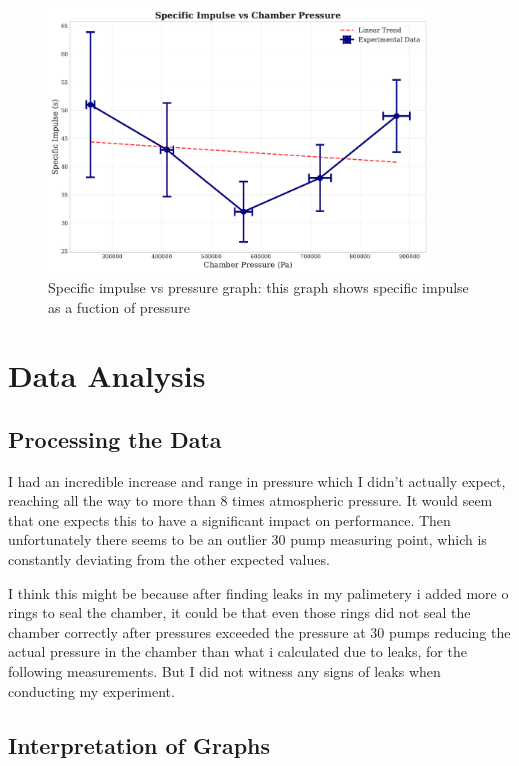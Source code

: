 \documentclass[12pt,a4paper]{article}
\begin{document}
\begin{figure}[H]
\centering
\includegraphics[width=0.9\textwidth]{specific_impulse_vs_pressure.pdf}
\caption{Specific impulse vs pressure graph: this graph shows specific impulse as a fuction of pressure}
\label{fig:specific_impulse_pressure}
\end{figure}

\section{Data Analysis}

\subsection{Processing the Data}

I had an incredible increase and range in pressure which I didn't actually expect, reaching all the way to more than 8 times atmospheric pressure. It would seem that one expects this to have a significant impact on performance. Then unfortunately there seems to be an outlier 30 pump measuring point, which is constantly deviating from the other expected values.

I think this might be because after finding leaks in my palimetery i added more o rings to seal the chamber, it could be that even those rings did not seal the chamber correctly after pressures exceeded the pressure at 30 pumps reducing the actual pressure in the chamber than what i calculated due to leaks, for the following measurements. But I did not witness any signs of leaks when conducting my experiment.

\subsection{Interpretation of Graphs}
\end{document}
